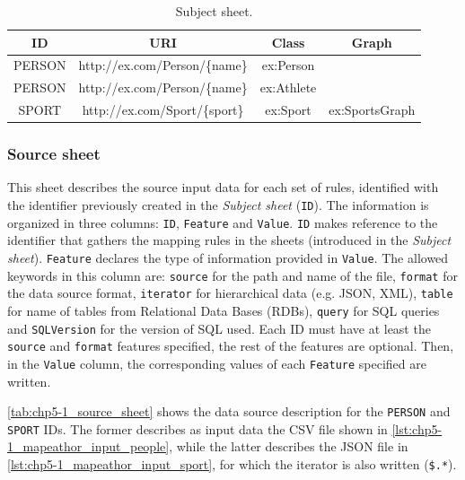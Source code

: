 \begin{table}[h!]
\caption{Subject sheet.}
\label{tab:chp5-1_subject_sheet}
\centering
\begin{tabular}{c|c|c|c}
\midrule
\textbf{ID} & \textbf{URI} & \textbf{Class} & \textbf{Graph} \\ \midrule
PERSON & http://ex.com/Person/\{name\} & ex:Person &  \\
PERSON & http://ex.com/Person/\{name\} & ex:Athlete &  \\
SPORT & http://ex.com/Sport/\{sport\} & ex:Sport & ex:SportsGraph \\ \midrule
\end{tabular}
\end{table}



\subsubsection{Source sheet} 

This sheet describes the source input data for each set of rules, identified with the identifier previously created in the \textit{Subject sheet} (\texttt{ID}). The information is organized in three columns: \texttt{ID}, \texttt{Feature} and \texttt{Value}. 
\texttt{ID} makes reference to the identifier that gathers the mapping rules in the sheets (introduced in the \textit{Subject sheet}). 
\texttt{Feature} declares the type of information provided in \texttt{Value}. The allowed keywords in this column are: \texttt{source} for the path and name of the file, \texttt{format} for the data source format, \texttt{iterator} for hierarchical data (e.g. JSON, XML), \texttt{table} for name of tables from Relational Data Bases (RDBs), \texttt{query} for SQL queries and \texttt{SQLVersion} for the version of SQL used. Each ID must have at least the \texttt{source} and \texttt{format} features specified, the rest of the features are optional. 
Then, in the \texttt{Value} column, the corresponding values of each \texttt{Feature} specified are written. 

\cref{tab:chp5-1_source_sheet} shows the data source description for the \texttt{PERSON} and \texttt{SPORT} IDs. The former describes as input data the CSV file shown in \cref{lst:chp5-1_mapeathor_input_people}, while the latter describes the JSON file in \cref{lst:chp5-1_mapeathor_input_sport}, for which the iterator is also written (\texttt{\$.*}). 

